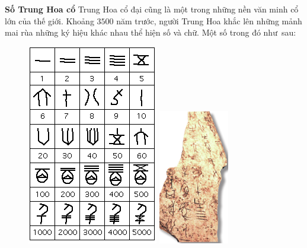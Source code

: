 \begin{multicols}{2}
\begin{figure}[H]
		\vspace*{-12pt}
	\end{figure}
	\vskip 0.1cm
	\textbf{\color{toancuabi}Số Trung Hoa cổ}
	\vskip 0.1cm
	Trung Hoa cổ đại cũng là một trong những nền văn minh cổ lớn của thế giới. Khoảng $3500$ năm trước, người Trung Hoa khắc lên những mảnh mai rùa những ký hiệu khác nhau thể hiện số và chữ. Một số trong đó như~sau:
	\begin{figure}[H]
		\centering
		\vspace*{5pt}
		\captionsetup{labelformat= empty, justification=centering}
		\includegraphics[height=0.8\linewidth]{china1}\quad
		\includegraphics[height=0.8\linewidth]{41}

\end{figure}
\end{multicols}
